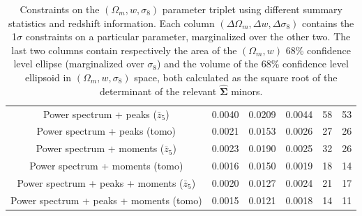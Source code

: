\documentclass[reprint,aps,prd,superscriptaddress,showkeys,showpacs]{revtex4-1}
\newcommand{\bbh}[1]{\mathbf{\hat{#1}}}
\begin{document}
\begin{table}
\begin{tabular}{c|c|c|c|c|c|}
           Power spectrum + peaks ($\bar{z}_5$) &            0.0040 &     0.0209 &            0.0044 &                            58 &                                         53 \\
                  Power spectrum + peaks (tomo) &            0.0021 &     0.0153 &            0.0026 &                            27 &                                         26 \\
         Power spectrum + moments ($\bar{z}_5$) &            0.0023 &     0.0190 &            0.0025 &                            32 &                                         26 \\
                Power spectrum + moments (tomo) &            0.0016 &     0.0150 &            0.0019 &                            18 &                                         14 \\
 Power spectrum + peaks + moments ($\bar{z}_5$) &            0.0020 &     0.0127 &            0.0024 &                            21 &                                         17 \\
        Power spectrum + peaks + moments (tomo) &            0.0015 &     0.0121 &            0.0018 &                            14 &                                         11 \\ \hline
\bottomrule
\end{tabular}
\caption{Constraints on the $(\Omega_m,w,\sigma_8)$ parameter triplet using different summary statistics and redshift information. Each column $(\Delta \Omega_m,\Delta w,\Delta \sigma_8)$ contains the 1$\sigma$ constraints on a particular parameter, marginalized over the other two. The last two columns contain respectively the area of the $(\Omega_m,w)$ 68\% confidence level ellipse (marginalized over $\sigma_8$) and the volume of the 68\% confidence level ellipsoid in $(\Omega_m,w,\sigma_8)$ space, both calculated as the square root of the determinant of the relevant $\bbh{\Sigma}$ minors.}
\label{tbl:constraints}
\end{table}
\end{document}

